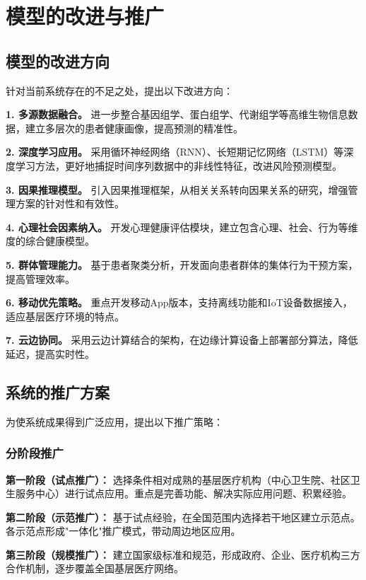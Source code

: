 
\section{模型的改进与推广}

\subsection{模型的改进方向}

针对当前系统存在的不足之处，提出以下改进方向：

\textbf{1. 多源数据融合。} 进一步整合基因组学、蛋白组学、代谢组学等高维生物信息数据，建立多层次的患者健康画像，提高预测的精准性。

\textbf{2. 深度学习应用。} 采用循环神经网络（RNN）、长短期记忆网络（LSTM）等深度学习方法，更好地捕捉时间序列数据中的非线性特征，改进风险预测模型。

\textbf{3. 因果推理模型。} 引入因果推理框架，从相关关系转向因果关系的研究，增强管理方案的针对性和有效性。

\textbf{4. 心理社会因素纳入。} 开发心理健康评估模块，建立包含心理、社会、行为等维度的综合健康模型。

\textbf{5. 群体管理能力。} 基于患者聚类分析，开发面向患者群体的集体行为干预方案，提高管理效率。

\textbf{6. 移动优先策略。} 重点开发移动App版本，支持离线功能和IoT设备数据接入，适应基层医疗环境的特点。

\textbf{7. 云边协同。} 采用云边计算结合的架构，在边缘计算设备上部署部分算法，降低延迟，提高实时性。

\subsection{系统的推广方案}

为使系统成果得到广泛应用，提出以下推广策略：

\subsubsection{分阶段推广}

\textbf{第一阶段（试点推广）：} 选择条件相对成熟的基层医疗机构（中心卫生院、社区卫生服务中心）进行试点应用。重点是完善功能、解决实际应用问题、积累经验。

\textbf{第二阶段（示范推广）：} 基于试点经验，在全国范围内选择若干地区建立示范点。各示范点形成"一体化"推广模式，带动周边地区应用。

\textbf{第三阶段（规模推广）：} 建立国家级标准和规范，形成政府、企业、医疗机构三方合作机制，逐步覆盖全国基层医疗网络。

